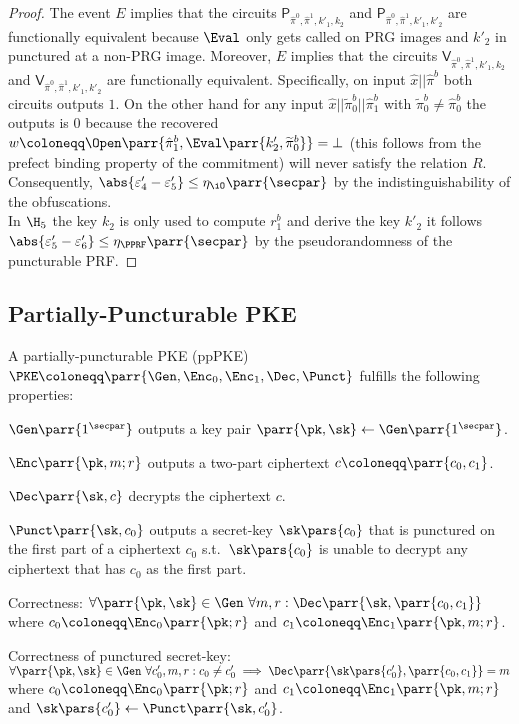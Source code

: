 \begin{proof}
    The event \(E\) implies that the circuits \(\textsf{P}_{\hat{\pi}^0,\hat{\pi}^1,k'_1,k_2}\) and \(\textsf{P}_{\hat{\pi}^0,\hat{\pi}^1,k'_1,k'_2}\) are functionally equivalent because \(\Eval\) only gets called on PRG images and \(k'_2\) in punctured at a non-PRG image.
    Moreover, \(E\) implies that the circuits \(\textsf{V}_{\hat{\pi}^0,\hat{\pi}^1,k'_1,k_2}\) and \(\textsf{V}_{\hat{\pi}^0,\hat{\pi}^1,k'_1,k'_2}\) are functionally equivalent.
    Specifically, on input \(\hat{x}||\hat{\pi}^b\) both circuits outputs \(1\).
    On the other hand for any input \(\hat{x}||\widetilde{\pi}_0^b||\hat{\pi}_1^b\) with \(\widetilde{\pi}_0^b \neq \hat{\pi}_0^b\) the outputs is \(0\) because the recovered \(w \coloneqq \Open\parr{\hat{\pi}_1^b, \Eval\parr{k'_2,\widetilde{\pi}_0^b}} = \bot\) (this follows from the prefect binding property of the commitment) will never satisfy the relation \(R\).
    Consequently, \(\abs{\varepsilon'_4 - \varepsilon'_5} \leq \eta_{\iO}\parr{\secpar}\) by the indistinguishability of the obfuscations.
    \\
    In \(\H_5\) the key \(k_2\) is only used to compute \(r_1^b\) and derive the key \(k'_2\) it follows \(\abs{\varepsilon'_5 - \varepsilon'_6} \leq \eta_{\PPRF}\parr{\secpar}\) by the pseudorandomness of the puncturable PRF.
\end{proof}


\subsection{Partially-Puncturable PKE}

\begin{definition}
    A partially-puncturable PKE (ppPKE) \(\PKE \coloneqq \parr{\Gen, \Enc_0, \Enc_1, \Dec, \Punct}\) fulfills the following properties:
    \begin{sitemize}
        \item \(\Gen\parr{1^\secpar}\) outputs a key pair \(\parr{\pk,\sk} \gets \Gen\parr{1^\secpar}\).
        \item \(\Enc\parr{\pk,m;r}\) outputs a two-part ciphertext \(c \coloneqq \parr{c_0,c_1}\).
        \item \(\Dec\parr{\sk,c}\) decrypts the ciphertext \(c\).
        \item \(\Punct\parr{\sk,c_0}\) outputs a secret-key \(\sk\pars{c_0}\) that is punctured on the first part of a ciphertext \(c_0\) s.t.\ \(\sk\pars{c_0}\) is unable to decrypt any ciphertext that has \(c_0\) as the first part.
        \item Correctness:
        \(\forall \parr{\pk,\sk} \in \Gen\ \forall m,r : \Dec\parr{\sk,\parr{c_0,c_1}}\) where \(c_0 \coloneqq \Enc_0\parr{\pk;r}\) and \(c_1 \coloneqq \Enc_1\parr{\pk,m;r}\).
        \item Correctness of punctured secret-key:
        \(\forall \parr{\pk,\sk} \in \Gen\ \forall c'_0,m,r : c_0 \neq c'_0 \implies \Dec\parr{\sk\pars{c'_0},\parr{c_0,c_1}} = m\) where \(c_0 \coloneqq \Enc_0\parr{\pk;r}\) and \(c_1 \coloneqq \Enc_1\parr{\pk,m;r}\) and \(\sk\pars{c'_0} \gets \Punct\parr{\sk,c'_0}\).
    \end{sitemize}
\end{definition}

